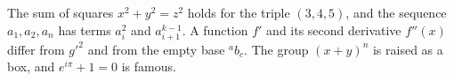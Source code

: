 \documentclass{article}
\begin{document}
The sum of squares $x^2+y^2=z^2$ holds for the triple $(3,4,5)$, and the
sequence $a_1, a_2, a_n$ has terms $a_i^2$ and $a_{i+1}^{k-1}$. A function
$f'$ and its second derivative $f''(x)$ differ from $g'^2$ and from the
empty base ${}^ab_c$. The group ${(x+y)}^{n}$ is raised as a box, and
$e^{i\pi}+1=0$ is famous.
\end{document}
